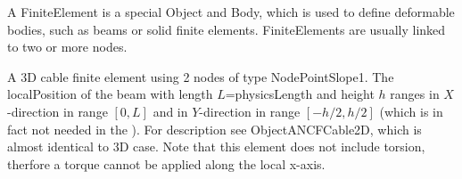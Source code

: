 \ei

%

\newpage
A FiniteElement is a special Object and Body, which is used to define deformable bodies, such as beams or solid finite elements. FiniteElements are usually linked to two or more nodes.


\label{sec:item:ObjectANCFCable}
A 3D cable finite element using 2 nodes of type NodePointSlope1. The localPosition of the beam with length $L$=physicsLength and height $h$ ranges in $X$-direction in range $[0, L]$ and in $Y$-direction in range $[-h/2,h/2]$ (which is in fact not needed in the ). For description see ObjectANCFCable2D, which is almost identical to 3D case. Note that this element does not include torsion, therfore a torque cannot be applied along the local x-axis.
\vspace{12pt}\\

